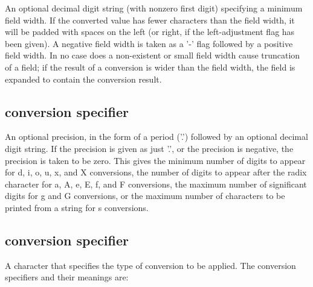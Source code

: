 An optional decimal digit string (with nonzero first digit) specifying a minimum field width. If the converted value has fewer characters than the field width, it will be padded with spaces on the left (or right, if the left-\/adjustment flag has been given). A negative field width is taken as a {\ttfamily '-\/'} flag followed by a positive field width. In no case does a non-\/existent or small field width cause truncation of a field; if the result of a conversion is wider than the field width, the field is expanded to contain the conversion result.\hypertarget{io_printf_The}{}\subsection{conversion specifier}\label{io_printf_The}
An optional precision, in the form of a period ({\ttfamily '.'}) followed by an optional decimal digit string. If the precision is given as just {\ttfamily '.'}, or the precision is negative, the precision is taken to be zero. This gives the minimum number of digits to appear for {\ttfamily d, i, o, u, x}, and {\ttfamily X} conversions, the number of digits to appear after the radix character for {\ttfamily a, A, e, E, f}, and {\ttfamily F} conversions, the maximum number of significant digits for {\ttfamily g} and {\ttfamily G} conversions, or the maximum number of characters to be printed from a string for s conversions.\hypertarget{io_printf_The}{}\subsection{conversion specifier}\label{io_printf_The}
A character that specifies the type of conversion to be applied. The conversion specifiers and their meanings are\-: 
